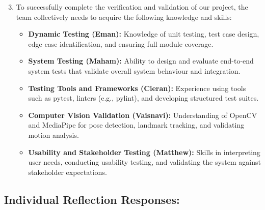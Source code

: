 \documentclass[12pt, titlepage]{article}
\begin{document}
\begin{enumerate}
  \setcounter{enumi}{2} %

  \item To successfully complete the verification and validation of our project, the team collectively needs to acquire the following knowledge and skills:

  \begin{itemize}
      \item \textbf{Dynamic Testing (Eman):} Knowledge of unit testing, test case design, edge case identification, and ensuring full module coverage.
      
      \item \textbf{System Testing (Maham):} Ability to design and evaluate end-to-end system tests that validate overall system behaviour and integration.
      
      \item \textbf{Testing Tools and Frameworks (Cieran):} Experience using tools such as pytest, linters (e.g., pylint), and developing structured test suites.
      
      \item \textbf{Computer Vision Validation (Vaisnavi):} Understanding of OpenCV and MediaPipe for pose detection, landmark tracking, and validating motion analysis.
      
      \item \textbf{Usability and Stakeholder Testing (Matthew):} Skills in interpreting user needs, conducting usability testing, and validating the system against stakeholder expectations.
  \end{itemize}

\end{enumerate}

\subsection*{Individual Reflection Responses:}
\end{document}
